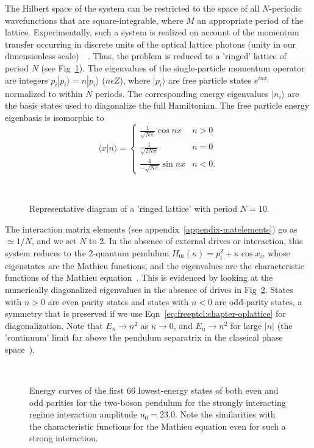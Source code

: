 The Hilbert space of the system can be restricted to the space of all $N$-periodic wavefunctions that are square-integrable, where $M$ an appropriate period of the lattice. Experimentally, such a system is realized on account of the momentum transfer occurring in discrete units of the optical lattice photons (unity in our dimensionless scale)~\cite{steck}~\cite{luter:reichl:3res}. Thus, the problem is reduced to a 'ringed' lattice of period $N$ (see Fig~\ref{fig:latticering:chapter-oplattice}). The eigenvalues of the single-particle momentum operator are integers $p_i|p_i\rangle=n|p_i\rangle$ ($n\epsilon Z$), where $|p_i\rangle$ are free particle states $e^{inx_i}$ normalized to within $N$ periods. The corresponding energy eigenvalues $|n_i\rangle$ are the basis states used to diagonalize the full Hamiltonian. The free particle energy eigenbasis is isomorphic to
\begin{equation}
\langle x | n \rangle=\left\{
\begin{array}{lll}
 \frac{1}{\sqrt{N\pi}}\cos{nx} & n>0 \\
 \frac{1}{\sqrt{2N\pi}} & n=0 \\
 \frac{1}{-\sqrt{N\pi}}\sin{nx } & n<0 .
\end{array}
\right.
\label{eq:freeptcl:chapter-oplattice}
\end{equation}
 \begin{figure}
 \ 
 \caption{Representative diagram of a 'ringed lattice' with period $N=10$.}
 \label{fig:latticering:chapter-oplattice}
 \end{figure}

The interaction matrix elements (see appendix~\ref{appendix-matelements}) go as $\simeq 1/N$, and we set $N$ to 2. In the absence of external drives or interaction, this system reduces to the 2-quantum pendulum $H_{0i}(\kappa)=p_i^2+\kappa \cos{x_i}$, whose eigenstates are the Mathieu functions, and the eigenvalues are the characteristic functions of the Mathieu equation~\cite{abramowitz:stegun}. This is evidenced by looking at the numerically diagonalized eigenvalues in the absence of drives in Fig~\ref{fig:energylevels:chapter-oplattice}. States with $n>0$ are even parity states and states with $n<0$ are odd-parity states, a symmetry that is preserved if we use Eqn~\ref{eq:freeptcl:chapter-oplattice} for diagonalization. Note that $E_n\rightarrow n^2$ as $\kappa \rightarrow 0$, and $E_n\rightarrow n^2$ for large $|n|$ (the 'continuum' limit far above the pendulum separatrix in the classical phase space~\cite{reichl-appendix}).
\begin{figure} 
\ 
\caption{Energy curves of the first $66$ lowest-energy states of both even and odd parities for the two-boson pendulum for the strongly interacting regime interaction amplitude $u_0=23.0$. Note the similarities with the characteristic functions for the Mathieu equation even for such a strong interaction.}
\label{fig:energylevels:chapter-oplattice}
\end{figure}

